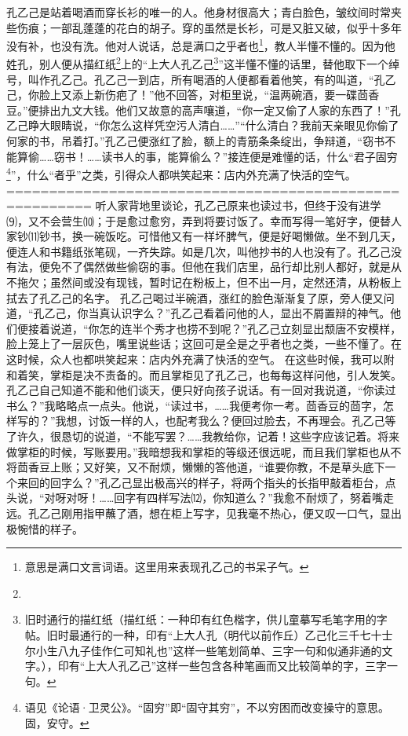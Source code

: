 \documentclass[12pt,UTF8]{ctexbook}
\begin{document}
孔乙己是站着喝酒而穿长衫的唯一的人。他身材很高大；青白脸色，皱纹间时常夹些伤痕；一部乱蓬蓬的花白的胡子。穿的虽然是长衫，可是又脏又破，似乎十多年没有补，也没有洗。他对人说话，总是满口之乎者也\footnote{意思是满口文言词语。这里用来表现孔乙己的书呆子气。}，教人半懂不懂的。因为他姓孔，别人便从描红纸\footnote{}上的“上大人孔乙己\footnote{旧时通行的描红纸（描红纸：一种印有红色楷字，供儿童摹写毛笔字用的字帖。旧时最通行的一种，印有“上大人孔（明代以前作丘）乙己化三千七十士尔小生八九子佳作仁可知礼也”这样一些笔划简单、三字一句和似通非通的文字。），印有“上大人孔乙己”这样一些包含各种笔画而又比较简单的字，三字一句。}”这半懂不懂的话里，替他取下一个绰号，叫作孔乙己。孔乙己一到店，所有喝酒的人便都看着他笑，有的叫道，“孔乙己，你脸上又添上新伤疤了！”他不回答，对柜里说，“温两碗酒，要一碟茴香豆。”便排出九文大钱。他们又故意的高声嚷道，“你一定又偷了人家的东西了！”孔乙己睁大眼睛说，“你怎么这样凭空污人清白……”“什么清白？我前天亲眼见你偷了何家的书，吊着打。”孔乙己便涨红了脸，额上的青筋条条绽出，争辩道，“窃书不能算偷……窃书！……读书人的事，能算偷么？”接连便是难懂的话，什么“君子固穷\footnote{语见《论语·卫灵公》。“固穷”即“固守其穷”，不以穷困而改变操守的意思。固，安守。}”，什么“者乎”之类，引得众人都哄笑起来：店内外充满了快活的空气。
========================================================
听人家背地里谈论，孔乙己原来也读过书，但终于没有进学⑼，又不会营生⑽；于是愈过愈穷，弄到将要讨饭了。幸而写得一笔好字，便替人家钞⑾钞书，换一碗饭吃。可惜他又有一样坏脾气，便是好喝懒做。坐不到几天，便连人和书籍纸张笔砚，一齐失踪。如是几次，叫他抄书的人也没有了。孔乙己没有法，便免不了偶然做些偷窃的事。但他在我们店里，品行却比别人都好，就是从不拖欠；虽然间或没有现钱，暂时记在粉板上，但不出一月，定然还清，从粉板上拭去了孔乙己的名字。
孔乙己喝过半碗酒，涨红的脸色渐渐复了原，旁人便又问道，“孔乙己，你当真认识字么？”孔乙己看着问他的人，显出不屑置辩的神气。他们便接着说道，“你怎的连半个秀才也捞不到呢？”孔乙己立刻显出颓唐不安模样，脸上笼上了一层灰色，嘴里说些话；这回可是全是之乎者也之类，一些不懂了。在这时候，众人也都哄笑起来：店内外充满了快活的空气。
在这些时候，我可以附和着笑，掌柜是决不责备的。而且掌柜见了孔乙己，也每每这样问他，引人发笑。孔乙己自己知道不能和他们谈天，便只好向孩子说话。有一回对我说道，“你读过书么？”我略略点一点头。他说，“读过书，……我便考你一考。茴香豆的茴字，怎样写的？”我想，讨饭一样的人，也配考我么？便回过脸去，不再理会。孔乙己等了许久，很恳切的说道，“不能写罢？……我教给你，记着！这些字应该记着。将来做掌柜的时候，写账要用。”我暗想我和掌柜的等级还很远呢，而且我们掌柜也从不将茴香豆上账；又好笑，又不耐烦，懒懒的答他道，“谁要你教，不是草头底下一个来回的回字么？”孔乙己显出极高兴的样子，将两个指头的长指甲敲着柜台，点头说，“对呀对呀！……回字有四样写法⑿，你知道么？”我愈不耐烦了，努着嘴走远。孔乙己刚用指甲蘸了酒，想在柜上写字，见我毫不热心，便又叹一口气，显出极惋惜的样子。
\end{document}
